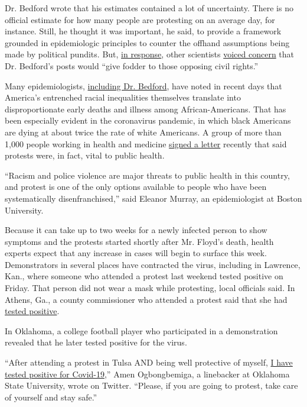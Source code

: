 Dr. Bedford wrote that his estimates contained a lot of uncertainty.
There is no official estimate for how many people are protesting on an
average day, for instance. Still, he thought it was important, he said,
to provide a framework grounded in epidemiologic principles to counter
the offhand assumptions being made by political pundits. But,
\href{https://twitter.com/NathanGrubaugh/status/1269699851438247937}{in
response}, other scientists
\href{https://twitter.com/mlipsitch/status/1269666394100162562}{voiced
concern} that Dr. Bedford's posts would ``give fodder to those opposing
civil rights.''

Many epidemiologists,
\href{https://twitter.com/trvrb/status/1269786159032397824}{including
Dr. Bedford}, have noted in recent days that America's entrenched racial
inequalities themselves translate into disproportionate early deaths and
illness among African-Americans. That has been especially evident in the
coronavirus pandemic, in which black Americans are dying at about twice
the rate of white Americans. A group of more than 1,000 people working
in health and medicine
\href{https://drive.google.com/file/d/1Jyfn4Wd2i6bRi12ePghMHtX3ys1b7K1A/view}{signed
a letter} recently that said protests were, in fact, vital to public
health.

``Racism and police violence are major threats to public health in this
country, and protest is one of the only options available to people who
have been systematically disenfranchised,'' said Eleanor Murray, an
epidemiologist at Boston University.

Because it can take up to two weeks for a newly infected person to show
symptoms and the protests started shortly after Mr. Floyd's death,
health experts expect that any increase in cases will begin to surface
this week. Demonstrators in several places have contracted the virus,
including in Lawrence, Kan., where someone who attended a protest last
weekend tested positive on Friday. That person did not wear a mask while
protesting, local officials said. In Athens, Ga., a county commissioner
who attended a protest said that she had
\href{https://slack-redir.net/link?url=https\%3A\%2F\%2Fwww.onlineathens.com\%2Fnews\%2F20200603\%2Fathens-commissioner-mariah-parker-tests-positive-for-coronavirus}{tested
positive}.

In Oklahoma, a college football player who participated in a
demonstration revealed that he later tested positive for the virus.

``After attending a protest in Tulsa AND being well protective of
myself,
\href{https://twitter.com/closedprayer/status/1267971181715632129?ref_src=twsrc\%5Etfw}{I
have tested positive for Covid-19},'' Amen Ogbongbemiga, a linebacker at
Oklahoma State University, wrote on Twitter. ``Please, if you are going
to protest, take care of yourself and stay safe.''


